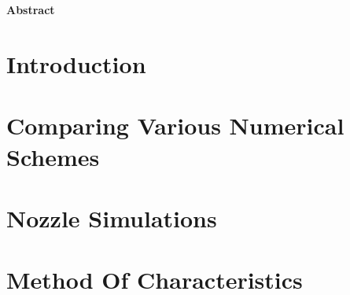 \documentclass[12pt,a4paper]{article}
\makeatletter
\renewcommand\tableofcontents{%
    \section*{\huge\centering\contentsname
        \@mkboth{%
           \MakeUppercase\contentsname}{\MakeUppercase\contentsname}}%
           \vspace{24pt}%
    \@starttoc{toc}%
    \newpage%
}
\makeatother
\begin{document}
\noindent{}
\pagestyle{empty} 
\tableofcontents
\newpage
\setcounter{page}{1}
\pagestyle{plain}
\listoffigures
\cleardoublepage

\listoftables
\cleardoublepage

\begin{center}
    {\bf \huge Abstract} \\[2em] 
\end{center}


\section{Introduction}
\label{section:Introduction}


\section{Comparing Various Numerical Schemes}
\label{section:Comparing the Numerical Scheme}


\section{Nozzle Simulations}
\label{section:hpc}


\section{Method Of Characteristics}
\label{section:trabrelacionados}

\end{document}
